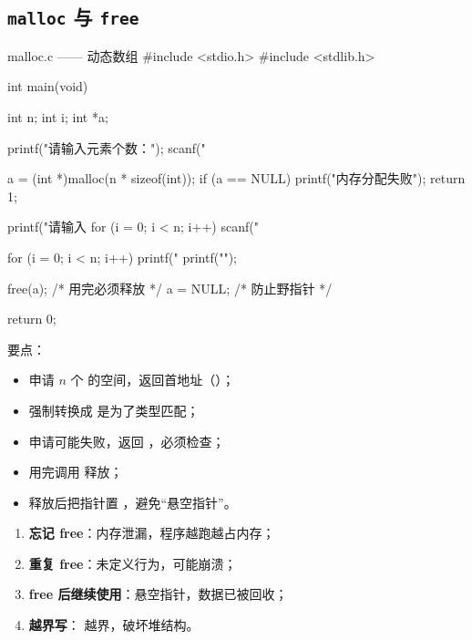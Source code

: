 \subsection{\texttt{malloc} 与 \texttt{free}}

\begin{codebox}{malloc.c —— 动态数组}
#include <stdio.h>
#include <stdlib.h>

int main(void)
{
    int n;
    int i;
    int *a;

    printf("请输入元素个数：");
    scanf("%

    a = (int *)malloc(n * sizeof(int));
    if (a == NULL) {
        printf("内存分配失败\n");
        return 1;
    }

    printf("请输入 %
    for (i = 0; i < n; i++) {
        scanf("%
    }

    for (i = 0; i < n; i++) {
        printf("%
    }
    printf("\n");

    free(a);        /* 用完必须释放 */
    a = NULL;       /* 防止野指针 */

    return 0;
}
\end{codebox}

要点：

\begin{itemize}
  \item {} 申请 $n$ 个  的空间，返回首地址（）；
  \item 强制转换成  是为了类型匹配；
  \item 申请可能失败，返回 ，必须检查；
  \item 用完调用  释放；
  \item 释放后把指针置 ，避免“悬空指针”。
\end{itemize}

\begin{pitfall}[动态内存的四个大坑]
\begin{enumerate}
  \item \textbf{忘记 free}：内存泄漏，程序越跑越占内存；
  \item \textbf{重复 free}：未定义行为，可能崩溃；
  \item \textbf{free 后继续使用}：悬空指针，数据已被回收；
  \item \textbf{越界写}： 越界，破坏堆结构。
\end{enumerate}
\end{pitfall}

